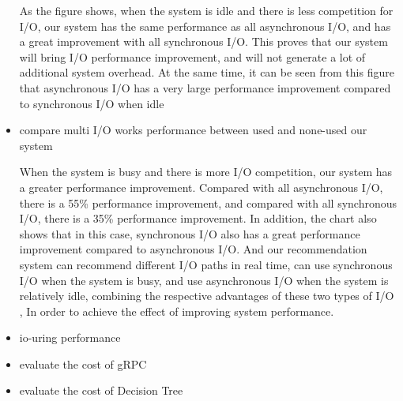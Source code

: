 \documentclass[conference]{IEEEtran}
\begin{document}
\begin{itemize}

As the figure shows, when the system is idle and there is less competition for I/O, 
our system has the same performance as all asynchronous I/O, and has a great improvement with all synchronous I/O. This proves that our system will bring I/O performance improvement, and will not generate a lot of additional system overhead. 
At the same time, it can be seen from this figure that asynchronous I/O has a very large performance improvement compared to synchronous I/O when idle

	\item compare multi I/O works performance between used and none-used our system
\datatable



  When the system is busy and there is more I/O competition, our system has a greater performance improvement. Compared with all asynchronous I/O, there is a 55\% performance improvement, and compared with all synchronous I/O, there is a 35\% performance improvement. In addition, the chart also shows that in this case, synchronous I/O also has a great performance improvement compared to asynchronous I/O.
And our recommendation system can recommend different I/O paths in real time, can use synchronous I/O when the system is busy, and use asynchronous I/O when the system is relatively idle, combining the respective advantages of these two types of I/O , In order to achieve the effect of improving system performance.
	\item io-uring performance
	\item evaluate the cost of gRPC
	\item evaluate the cost of Decision Tree
\end{itemize}
\end{document}
